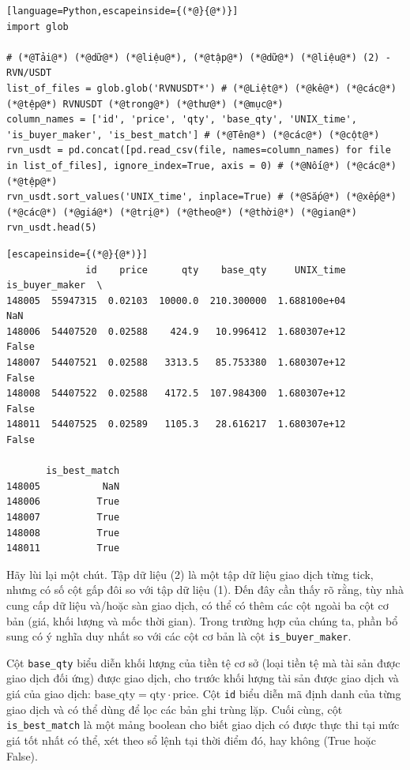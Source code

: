\begin{lstlisting}[language=Python,escapeinside={(*@}{@*)}]
import glob

# (*@Tải@*) (*@dữ@*) (*@liệu@*), (*@tập@*) (*@dữ@*) (*@liệu@*) (2) - RVN/USDT
list_of_files = glob.glob('RVNUSDT*') # (*@Liệt@*) (*@kê@*) (*@các@*) (*@tệp@*) RVNUSDT (*@trong@*) (*@thư@*) (*@mục@*)
column_names = ['id', 'price', 'qty', 'base_qty', 'UNIX_time', 'is_buyer_maker', 'is_best_match'] # (*@Tên@*) (*@các@*) (*@cột@*)
rvn_usdt = pd.concat([pd.read_csv(file, names=column_names) for file in list_of_files], ignore_index=True, axis = 0) # (*@Nối@*) (*@các@*) (*@tệp@*)
rvn_usdt.sort_values('UNIX_time', inplace=True) # (*@Sắp@*) (*@xếp@*) (*@các@*) (*@giá@*) (*@trị@*) (*@theo@*) (*@thời@*) (*@gian@*)
rvn_usdt.head(5)
\end{lstlisting}

\begin{lstlisting}[escapeinside={(*@}{@*)}]
              id    price      qty    base_qty     UNIX_time is_buyer_maker  \
148005  55947315  0.02103  10000.0  210.300000  1.688100e+04            NaN   
148006  54407520  0.02588    424.9   10.996412  1.680307e+12          False   
148007  54407521  0.02588   3313.5   85.753380  1.680307e+12          False   
148008  54407522  0.02588   4172.5  107.984300  1.680307e+12          False   
148011  54407525  0.02589   1105.3   28.616217  1.680307e+12          False   

       is_best_match  
148005           NaN  
148006          True  
148007          True  
148008          True  
148011          True  
\end{lstlisting}

Hãy lùi lại một chút. Tập dữ liệu (2) là một tập dữ liệu giao dịch từng tick, nhưng có số cột gấp đôi so với tập dữ liệu (1). Đến đây cần thấy rõ rằng, tùy nhà cung cấp dữ liệu và/hoặc sàn giao dịch, có thể có thêm các cột ngoài ba cột cơ bản (giá, khối lượng và mốc thời gian). Trong trường hợp của chúng ta, phần bổ sung có ý nghĩa duy nhất so với các cột cơ bản là cột \texttt{is\_buyer\_maker}.

Cột \texttt{base\_qty} biểu diễn khối lượng của tiền tệ cơ sở (loại tiền tệ mà tài sản được giao dịch đối ứng) được giao dịch, cho trước khối lượng tài sản được giao dịch và giá của giao dịch: $\text{base\_qty} = \text{qty} \cdot \text{price}$. Cột \texttt{id} biểu diễn mã định danh của từng giao dịch và có thể dùng để lọc các bản ghi trùng lặp. Cuối cùng, cột \texttt{is\_best\_match} là một mảng boolean cho biết giao dịch có được thực thi tại mức giá tốt nhất có thể, xét theo sổ lệnh tại thời điểm đó, hay không (True hoặc False).


